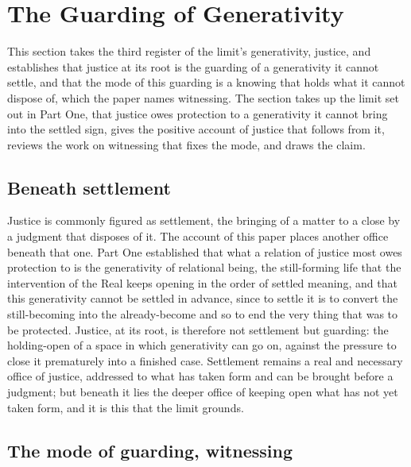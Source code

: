 \section{The Guarding of Generativity}
\label{p26:sec:justicegen}

\noindent
This section takes the third register of the limit's generativity, justice, and establishes that justice at its root is the guarding of a generativity it cannot settle, and that the mode of this guarding is a knowing that holds what it cannot dispose of, which the paper names witnessing. The section takes up the limit set out in Part One, that justice owes protection to a generativity it cannot bring into the settled sign, gives the positive account of justice that follows from it, reviews the work on witnessing that fixes the mode, and draws the claim.

\subsection*{Beneath settlement}

Justice is commonly figured as settlement, the bringing of a matter to a close by a judgment that disposes of it. The account of this paper places another office beneath that one. Part One established that what a relation of justice most owes protection to is the generativity of relational being, the still-forming life that the intervention of the Real keeps opening in the order of settled meaning, and that this generativity cannot be settled in advance, since to settle it is to convert the still-becoming into the already-become and so to end the very thing that was to be protected. Justice, at its root, is therefore not settlement but guarding: the holding-open of a space in which generativity can go on, against the pressure to close it prematurely into a finished case. Settlement remains a real and necessary office of justice, addressed to what has taken form and can be brought before a judgment; but beneath it lies the deeper office of keeping open what has not yet taken form, and it is this that the limit grounds.

\subsection*{The mode of guarding, witnessing}

